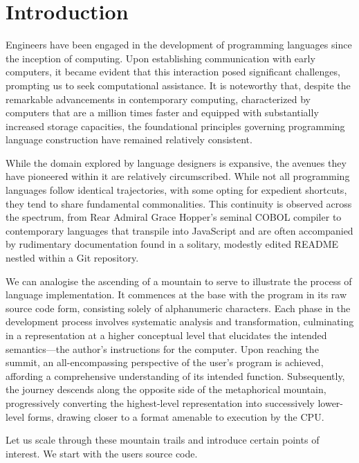 
\chapter{Introduction}\label{ch:introduction}

Engineers have been engaged in the development of programming languages since the inception of computing. Upon establishing communication with early computers, it became evident that this interaction posed significant challenges, prompting us to seek computational assistance. It is noteworthy that, despite the remarkable advancements in contemporary computing, characterized by computers that are a million times faster and equipped with substantially increased storage capacities, the foundational principles governing programming language construction have remained relatively consistent.

While the domain explored by language designers is expansive, the avenues they have pioneered within it are relatively circumscribed. While not all programming languages follow identical trajectories, with some opting for expedient shortcuts, they tend to share fundamental commonalities. This continuity is observed across the spectrum, from Rear Admiral Grace Hopper's seminal COBOL compiler to contemporary languages that transpile into JavaScript and are often accompanied by rudimentary documentation found in a solitary, modestly edited README nestled within a Git repository.

We can analogise the ascending of a mountain to serve to illustrate the process of language implementation. It commences at the base with the program in its raw source code form, consisting solely of alphanumeric characters. Each phase in the development process involves systematic analysis and transformation, culminating in a representation at a higher conceptual level that elucidates the intended semantics—the author's instructions for the computer. Upon reaching the summit, an all-encompassing perspective of the user's program is achieved, affording a comprehensive understanding of its intended function. Subsequently, the journey descends along the opposite side of the metaphorical mountain, progressively converting the highest-level representation into successively lower-level forms, drawing closer to a format amenable to execution by the \ac{CPU}.

Let us scale through these mountain trails and introduce certain points of interest. We start with the users source code.

